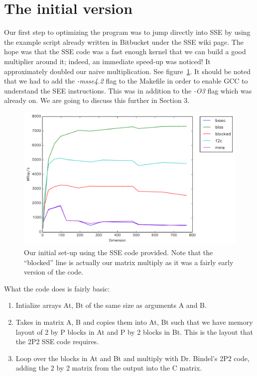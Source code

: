 \documentclass{article}
\begin{document}
\section{The initial version}
  Our first step to optimizing the program was to jump directly into SSE by using the example script already written in Bitbucket under the SSE wiki page.
  The hope was that the SSE code was a fast enough kernel that we can build a good multiplier around it; indeed, an immediate
  speed-up was noticed! It approximately doubled our naive multiplication. See figure~\ref{fig:initial}. It should be noted that we had to add the \textit{-msse4.2} flag to the Makefile in order to enable GCC to understand the SEE instructions. This was in addition to the \textit{-O3} flag which was already on. We are going to discuss this further in Section 3.

  \begin{figure}[h]
    \centering
    \includegraphics[width=.7\textwidth]{initial.pdf}
    \caption{Our initial set-up using the SSE code provided. Note that the ``blocked'' line is actually our matrix multiply as it was a fairly early version of the code.}
    \label{fig:initial}
  \end{figure}

  What the code does is fairly basic:
  \begin{enumerate}
    \item Intialize arrays At, Bt of the same size as arguments A and B.
     \item Takes in matrix A, B and copies them into At, Bt such that we have memory layout of 2 by P blocks in At and P by 2 blocks in Bt.
       This is the layout that the 2P2 SSE code requires.
     \item Loop over the blocks in At and Bt and multiply with Dr. Bindel's 2P2 code, adding the 2 by 2 matrix from the output into the C matrix.
  \end{enumerate}
\end{document}
